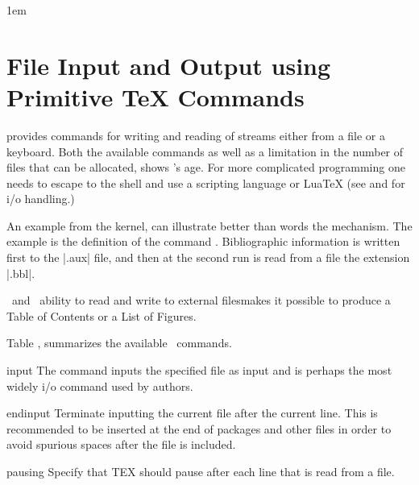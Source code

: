 \parindent1em
\chapter{File Input and Output using Primitive TeX Commands}

\tex provides commands for writing and reading of streams
either from a file or a keyboard. Both the available commands as well as a limitation in the number of files that can be allocated, shows \tex's age. For more complicated programming one needs to escape to the shell and use a scripting language or LuaTeX (see  and  for  i/o handling.)

An example from the \latexe kernel, can illustrate better than
words the mechanism. The example is the definition of
the command . Bibliographic information is written first to the |.aux| file, and then at the second run is read from a file the extension |.bbl|.


\tex\ and \latex\  ability to read and write to external filesmakes it possible to produce
a Table of Contents or a List of Figures. 


Table , summarizes the available \tex\ commands. 



\begin{docCommand*}{input} {}
The command  inputs the specified file as \tex input and is perhaps the most widely  i/o command used by authors. 
\end{docCommand*}

\begin{texexample}{}{}
\meaning
\end{texexample}



\begin{docCommand}{endinput}{}
 Terminate inputting the current file after the current line. This is recommended to be inserted at the
end of packages and other files in order to avoid spurious spaces after the file is included.
\end{docCommand}

\begin{docCommand*}{pausing}{}
  Specify that TEX should pause after each line that is read from a file.
\end{docCommand*}

